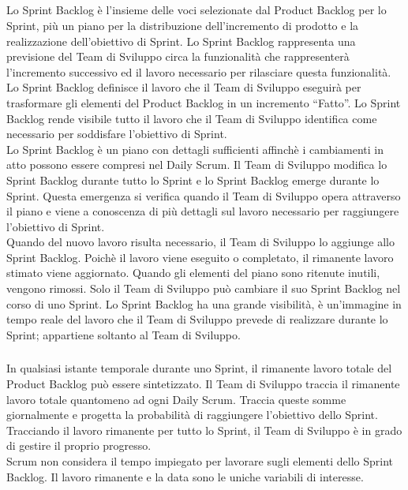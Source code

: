 \subsection*{\color{SteelBlue}{Sprint Backlog}}
\label{sec:sprint_backlog}
Lo Sprint Backlog \`e l'insieme delle voci selezionate dal Product Backlog per lo Sprint, 
pi\`u un piano per la distribuzione dell'incremento di prodotto e la realizzazione 
dell'obiettivo di Sprint. Lo Sprint Backlog rappresenta una previsione del Team di 
Sviluppo circa la funzionalità che rappresenter\`a  l'incremento successivo ed il lavoro 
necessario per rilasciare questa funzionalit\`a. \newline
\\ Lo Sprint Backlog definisce il lavoro che il Team di Sviluppo eseguir\`a per 
trasformare gli elementi del Product Backlog in un incremento ``Fatto''. Lo Sprint Backlog rende visibile tutto il 
lavoro che il Team di Sviluppo identifica come necessario per soddisfare l'obiettivo di Sprint. \newline
\\Lo Sprint Backlog \`e un piano con dettagli sufficienti affinch\`e i cambiamenti in atto 
possono essere compresi nel Daily Scrum. Il Team di Sviluppo modifica lo Sprint Backlog 
durante tutto lo Sprint e lo Sprint Backlog emerge durante lo Sprint. Questa emergenza si 
verifica quando il Team di Sviluppo opera attraverso il piano e viene a conoscenza di 
pi\`u dettagli sul lavoro necessario per raggiungere l'obiettivo di Sprint. \newline
\\Quando del nuovo lavoro risulta necessario, il Team di Sviluppo lo aggiunge allo Sprint 
Backlog. Poich\`e il lavoro viene eseguito o completato, il rimanente lavoro stimato viene 
aggiornato. Quando gli elementi del piano sono ritenute inutili, vengono rimossi. Solo il 
Team di Sviluppo pu\`o cambiare il suo Sprint Backlog nel corso di uno Sprint. Lo Sprint 
Backlog ha una grande visibilit\`a, \`e un'immagine in tempo reale del lavoro che il Team 
di Sviluppo prevede di realizzare durante lo Sprint; appartiene soltanto al Team di Sviluppo.

\subsubsection*{\color{SteelBlue}{Monitorare i Progressi dello Sprint}} %
\label{ssub:monitoring_sprint_progress}
In qualsiasi istante temporale durante uno Sprint, il rimanente lavoro totale del Product Backlog 
pu\`o essere sintetizzato. Il Team di Sviluppo traccia il rimanente lavoro totale quantomeno 
ad ogni Daily Scrum. Traccia queste somme giornalmente e progetta la probabilit\`a di 
raggiungere l'obiettivo dello Sprint. Tracciando il lavoro rimanente per tutto lo Sprint, 
il Team di Sviluppo \`e in grado di gestire il proprio progresso. \newline
\\Scrum non considera il tempo impiegato per lavorare sugli elementi dello Sprint Backlog. 
Il lavoro rimanente e la data sono le uniche variabili di interesse. 

